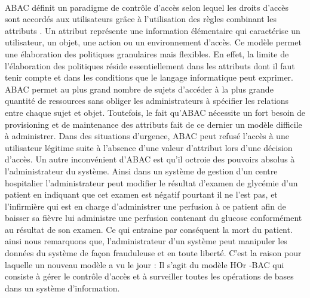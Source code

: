 \paragraph{} ABAC définit un paradigme de contrôle d'accès selon lequel les droits d'accès sont accordés aux utilisateurs grâce à l'utilisation des règles combinant les attributs \cite{Vin15}. Un attribut représente une information élémentaire qui caractérise un utilisateur, un objet, une action ou un environnement d'accès. Ce modèle permet une élaboration des politiques granulaires mais flexibles. En effet, la limite de l'élaboration des politiques réside essentiellement dans les attributs dont il faut tenir compte et dans les conditions que le langage informatique peut exprimer. ABAC permet au plus grand nombre de sujets d'accéder à la plus grande quantité de ressources sans obliger les administrateurs à spécifier les relations entre chaque sujet et objet. Toutefois, le fait qu'ABAC nécessite un fort besoin de provisioning et de maintenance des attributs fait de ce dernier un modèle difficile à administrer. Dans des situations d'urgence, ABAC peut refusé l'accès à une utilisateur légitime suite à l'absence d'une valeur d'attribut lors d'une décision d'accès. Un autre inconvénient d'ABAC est qu'il octroie des pouvoirs absolus à l'administrateur du système. Ainsi dans un système de gestion d'un centre hospitalier l'administrateur peut modifier le résultat d'examen de glycémie d'un patient en indiquant que cet examen est négatif pourtant  il ne l'est pas, et l'infirmière qui est en charge d'administrer une perfusion à ce patient afin de baisser sa fièvre lui administre une perfusion contenant du glucose conformément au résultat de son examen. Ce qui entraine par conséquent la mort du patient. ainsi nous remarquons que, l'administrateur d'un système peut manipuler les données du système de façon frauduleuse et en toute liberté. C'est la raison pour laquelle un nouveau modèle a vu le jour : Il s'agit du modèle HOr -BAC qui consiste à gérer le contrôle d'accès et à surveiller toutes les opérations de bases dans un système d'information.
